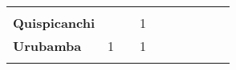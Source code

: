 \begin{tabular}{lccccccccc}
	&\cellcolor[HTML]{FCC46C} \\
	\textbf{Quispicanchi}                       
    &\cellcolor[HTML]{FCC46C}        			&\cellcolor[HTML]{FCC46C}                   &1                   
	&\cellcolor[HTML]{FCC46C}                   &\cellcolor[HTML]{FCC46C}                  
	&\cellcolor[HTML]{FCC46C}                   &\cellcolor[HTML]{FCC46C} 		 &\cellcolor[HTML]{FCC46C} 					&\cellcolor[HTML]{FCC46C} \\
	\textbf{Urubamba}                           
	&1        
	&\cellcolor[HTML]{FCC46C}                   &1                   
	&\cellcolor[HTML]{FCC46C}                   &\cellcolor[HTML]{FCC46C}                     &\cellcolor[HTML]{FCC46C}                   &\cellcolor[HTML]{FCC46C} 		 &\cellcolor[HTML]{FCC46C}					&\cellcolor[HTML]{FCC46C} \\
	&\multicolumn{1}{l}{}                       &\multicolumn{1}{l}{}            &\multicolumn{1}{l}{}                         
	&\multicolumn{1}{l}{}                       &\multicolumn{1}{l}{}            &\multicolumn{1}{l}{}                       &\multicolumn{1}{l}{}                       &\multicolumn{1}{l}{}            &\multicolumn{1}{l}{}    
\end{tabular}